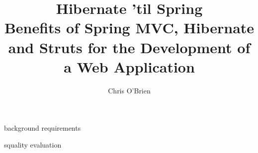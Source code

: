\documentclass[a4paper,10pt,fleqn]{report}
\begin{document}
\title{Hibernate 'til Spring \\ Benefits of Spring MVC, Hibernate and Struts for the Development of a Web Application}
\author{Chris O'Brien}
\maketitle

\begin{abstract}      

\end{abstract}        

%
%
\tableofcontents

%
%
\listoffigures

%
%
\listoftables


 {background}
 {requirements}


 {squality}
 {evaluation}


  
\appendix

\end{document}
